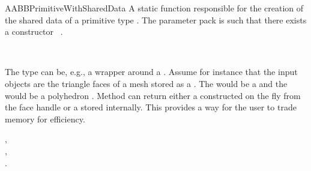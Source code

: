 \begin{ccRefConcept}{AABBPrimitiveWithSharedData}
  {A static function responsible for the creation of the shared data of a primitive type . 
   The parameter pack is such that there exists a constructor  \ccRefName\ .
  }

\ccSeeAlso
{}\\

\ccExample

The  type can be, e.g., a wrapper around a . Assume for instance that the input objects are the triangle faces of a mesh stored as a . The  would be a  and the  would be a polyhedron . Method  can return either a  constructed on the fly from the face handle or a  stored internally. This provides a way for the user to trade memory for efficiency.

\ccHasModels
{},\\
,\\
.\\


\end{ccRefConcept}

\ccRefPageEnd
